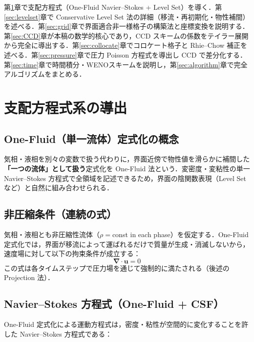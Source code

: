 \documentclass[12pt, a4paper, titlepage, xelatex, ja=standard]{bxjsarticle}
\newcommand{\bu}{\bm{u}}
\newcommand{\bnabla}{\bm{\nabla}}
\begin{document}
第\ref{sec:governing}章で支配方程式（One-Fluid Navier--Stokes + Level Set）を導く．第\ref{sec:levelset}章で Conservative Level Set 法の詳細（移流・再初期化・物性補間）を述べる．第\ref{sec:grid}章で界面適合非一様格子の構築法と座標変換を説明する．第\ref{sec:CCD}章が本稿の数学的核心であり，CCD スキームの係数をテイラー展開から完全に導出する．第\ref{sec:collocate}章でコロケート格子と Rhie--Chow 補正を述べる．第\ref{sec:pressure}章で圧力 Poisson 方程式を導出し CCD で差分化する．第\ref{sec:time}章で時間積分・WENOスキームを説明し，第\ref{sec:algorithm}章で完全アルゴリズムをまとめる．


\section{支配方程式系の導出}
\label{sec:governing}

\subsection{One-Fluid（単一流体）定式化の概念}

気相・液相を別々の変数で扱う代わりに，界面近傍で物性値を滑らかに補間した \textbf{「一つの流体」として扱う}定式化を One-Fluid 法という．変密度・変粘性の単一 Navier--Stokes 方程式で全領域を記述できるため，界面の陰関数表現（Level Set など）と自然に組み合わせられる．

\subsection{非圧縮条件（連続の式）}

気相・液相とも非圧縮性流体（$\rho = $const in each phase）を仮定する．One-Fluid 定式化では，界面が移流によって運ばれるだけで質量が生成・消滅しないから，速度場に対して以下の拘束条件が成立する：
\begin{equation}
  \bnabla \cdot \bu = 0
  \label{eq:continuity}
\end{equation}
この式は各タイムステップで圧力場を通じて強制的に満たされる（後述の Projection 法）．

\subsection{Navier--Stokes 方程式（One-Fluid + CSF）}

One-Fluid 定式化による運動方程式は，密度・粘性が空間的に変化することを許した Navier--Stokes 方程式である：
\end{document}
